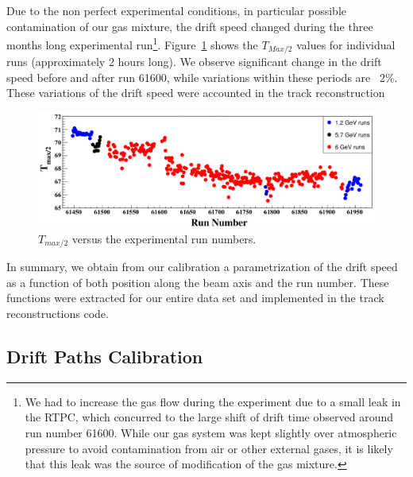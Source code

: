 \documentclass[preprint,5p]{elsarticle}
\begin{document}
Due to the non perfect experimental conditions, in particular possible contamination 
of our gas mixture, the drift speed changed during the three months long experimental 
run\footnote{We had to increase the gas flow during the experiment due to a small leak 
in the RTPC, which concurred to the large shift of drift time observed around run number 
61600. While our gas system was kept slightly over 
atmospheric pressure to avoid contamination from air or other external gases, it 
is likely that this leak was the source of modification of the gas mixture.}.  
Figure~\ref{fig:Drift_run_number_1} shows the $T_{Max/2}$ values for 
individual runs (approximately 2 hours long). We observe significant change in 
the drift speed before and after run 61600, while variations within these periods 
are ~2\%. These variations of the drift speed were accounted in the track reconstruction

\begin{figure}[tb]
\centering
\includegraphics[width=16.5cm]{fig_2017/Drift_run_number.pdf}
\caption{$T_{max/2}$ versus the experimental run numbers.} 
\label{fig:Drift_run_number_1}
\end{figure}


In summary, we obtain from our calibration a parame\-tri\-zation of the drift speed 
as a function of both position along the beam axis and the run number. These 
functions were extracted for our entire data set and implemented in the 
track reconstructions code.
   
\subsection{Drift Paths Calibration}
\end{document}
